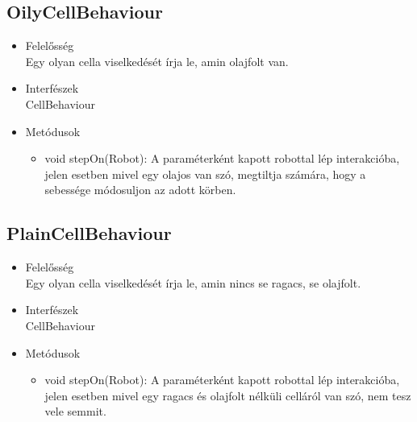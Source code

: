 \subsection{OilyCellBehaviour}
\begin{itemize}
	\item Felelősség\\
	Egy olyan cella viselkedését írja le, amin olajfolt van.
	\item Interfészek\\
	CellBehaviour
	\item Metódusok
	\begin{itemize}
		\item void stepOn(Robot): A paraméterként kapott robottal lép interakcióba, jelen esetben mivel egy olajos van szó, megtiltja számára, hogy a sebessége módosuljon az adott körben.
	\end{itemize}
\end{itemize}

\subsection{PlainCellBehaviour}
\begin{itemize}
	\item Felelősség\\
	Egy olyan cella viselkedését írja le, amin nincs se ragacs, se olajfolt.
	\item Interfészek\\
	CellBehaviour
	\item Metódusok
	\begin{itemize}
		\item void stepOn(Robot): A paraméterként kapott robottal lép interakcióba, jelen esetben mivel egy ragacs és olajfolt nélküli celláról van szó, nem tesz vele semmit.
	\end{itemize}
\end{itemize}

